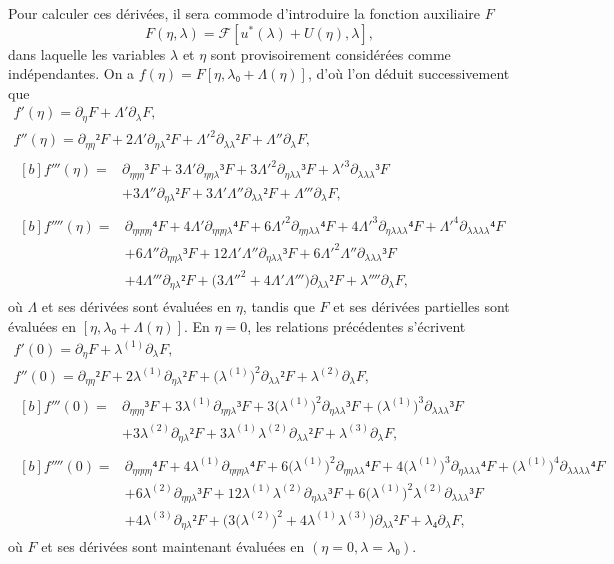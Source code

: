 \documentclass[12pt, final]{scrartcl}
\theoremstyle{definition}
\newcommand{\order}[2][1]{#2^{(#1)}}
\begin{document}
Pour calculer ces dérivées, il sera commode d'introduire la fonction auxiliaire
\(F\)
\begin{equation*}
  F(η, λ) =\mathcal{F}[u^{\ast}(λ) + U(η), λ],
\end{equation*}
dans laquelle les variables \(λ\) et \(η\) sont provisoirement considérées comme
indépendantes. On a \(f(η) = F[η, λ₀ + Λ(η)]\), d'où l'on déduit successivement
que
\begin{gather*}
  f'(η) = ∂_{η} F + Λ' ∂_{λ} F,\\
  f''(η) = ∂_{ηη}² F + 2Λ' ∂_{ηλ}²F + Λ'^2 ∂_{λλ}² F + Λ'' ∂_{λ} F,\\
  \begin{aligned}[b]
    f'''(η) ={}
    & ∂_{ηηη}³ F + 3Λ' ∂_{ηηλ}³F + 3Λ'^2 ∂_{ηλλ}³F + λ'^3 ∂_{λλλ}³ F\\
    & + 3Λ'' ∂_{ηλ}² F + 3Λ' Λ'' ∂_{λ λ}² F + Λ''' ∂_{λ} F,
  \end{aligned}\\
  \begin{aligned}[b]
    f''''(η) ={}
    & ∂_{ηηηη}⁴ F + 4Λ' ∂_{ηηηλ}⁴F + 6Λ'^2 ∂_{ηηλλ}⁴F + 4Λ'^3 ∂_{ηλλλ}⁴F + Λ'^4 ∂_{λλλλ}⁴ F\\
    & + 6Λ'' ∂_{ηηλ}³ F + 12Λ' Λ'' ∂_{ηλλ}³F + 6Λ'^2 Λ'' ∂_{λλλ}³ F\\
    & + 4 Λ''' ∂_{ηλ}² F + \bigl( 3Λ''^2 + 4 Λ' Λ''' \bigr) ∂_{λλ}² F + λ'''' ∂_{λ}F,
  \end{aligned}
\end{gather*}
où \(Λ\) et ses dérivées sont évaluées en \(η\), tandis que \(F\) et ses
dérivées partielles sont évaluées en \([η, λ₀ + Λ(η)]\). En \(η = 0\), les
relations précédentes s'écrivent
\begin{gather}
  \label{eq:20220107060454}
  f'(0) = ∂_{η} F + \order[1]λ ∂_{λ} F,\\
  \label{eq:20220107124311}
  f''(0) = ∂_{ηη}² F + 2 \order[1]λ ∂_{ηλ}² F + \bigl( \order[1]λ \bigr)^2 ∂_{λλ}² F + \order[2]λ ∂_{λ} F,\\
  \label{eq:20220107060500}
  \begin{aligned}[b]
    f'''(0) ={}
    & ∂_{ηηη}³ F + 3 \order[1]λ ∂_{ηηλ}³ F + 3 \bigl( \order[1]λ \bigr)^2 ∂_{ηλλ}³ F + \bigl( \order[1]λ \bigr)^3 ∂_{λλλ}³ F\\
    & + 3 \order[2]λ ∂_{ηλ}² F + 3 \order[1]λ \order[2]λ ∂_{λλ}² F + \order[3]λ ∂_{λ} F,
  \end{aligned}\\
  \label{eq:20220602185935}
  \begin{aligned}[b]
    f''''(0) ={}
    & ∂_{ηηηη}⁴F + 4 \order[1]λ ∂_{ηηηλ}⁴ F + 6 \bigl( \order[1]λ \bigr)^2 ∂_{ηηλλ}⁴ F + 4 \bigl( \order[1]λ \bigr)^3 ∂_{ηλλλ}⁴ F + \bigl( \order[1]λ \bigr)^4 ∂_{λλλλ}⁴ F\\
    & + 6 \order[2]λ ∂_{ηηλ}³ F + 12 \order[1]λ \order[2]λ ∂_{ηλλ}³ F + 6 \bigl( \order[1]λ \bigr)^2 \order[2]λ ∂_{λλλ}³ F\\
    & + 4 \order[3]λ ∂_{ηλ}² F + \bigl(3 \bigl( \order[2]λ \bigr)^2 + 4 \order[1]λ \order[3]λ\bigr) ∂_{λλ}² F + λ₄ ∂_{λ} F,
  \end{aligned}
\end{gather}
où \(F\) et ses dérivées sont maintenant évaluées en \((η = 0, λ = λ₀)\).
\end{document}
